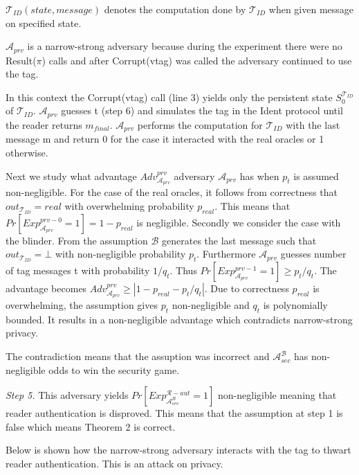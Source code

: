     $\mathcal{T}_{ID}(state, message)$ denotes the computation done by $\mathcal{T}_{ID}$ 
    when given message on specified state. 
    
    $\mathcal{A}_{prv}$ is a narrow-strong adversary because during the experiment there were no Result($\pi$) calls and after Corrupt(vtag) was called 
    the adversary continued to use the tag.

    In this context the Corrupt(vtag) call (line 3) yields only the persistent state $S_0^{\mathcal{T}_{ID}}$ of 
    $\mathcal{T}_{ID}$. $\mathcal{A}_{prv}$ guesses t (step 6) and simulates the tag in the Ident protocol until 
    the reader returns $m_{final}$. $\mathcal{A}_{prv}$ performs the computation for $\mathcal{T}_{ID}$ with the last
    message m and return 0 for the case it interacted with the real oracles or 1 otherwise.

    Next we study what advantage $Adv_{\mathcal{A}_{prv}}^{prv}$ adversary $\mathcal{A}_{prv}$ has when $p_t$ is assumed non-negligible.
    For the case of the real oracles, it follows from correctness that $out_{\mathcal{T}_{ID}} = real$ with overwhelming
    probability $p_{real}$. This means that $Pr[Exp_{\mathcal{A}_{prv}}^{prv-0} = 1] = 1-p_{real}$ is negligible. Secondly we consider the case
    with the blinder. From the assumption $\mathcal{B}$ generates the last message such that $out_{\mathcal{T}_{ID}} = \bot$ with 
    non-negligible probability $p_t$. Furthermore $\mathcal{A}_{prv}$ guesses number of tag messages t with 
    probability $1/q_t$. Thus $Pr[Exp_{\mathcal{A}_{prv}}^{prv-1} = 1] \ge p_t/q_t$. The advantage becomes
    $Adv_{\mathcal{A}_{prv}}^{prv} \ge |1-p_{real}-p_t/q_t|$. Due to correctness $p_{real}$ is overwhelming, the 
    assumption gives $p_t$ non-negligible and $q_t$ is polynomially bounded. It results in a non-negligible 
    advantage which contradicts narrow-strong privacy.

    The contradiction means that the assuption was incorrect and $\mathcal{A}_{sec}^{\mathcal{B}}$ has non-negligible odds to win the security game.

    \textit{Step 5.} This adversary yields $Pr[Exp_{\mathcal{A}_{sec}^{B}}^{\mathcal{R}-aut} = 1]$ non-negligible meaning that reader authentication is disproved. 
    This means that the assumption at step 1 is false which means Theorem 2 is correct. 

    Below is shown how the narrow-strong adversary interacts with the tag to
    thwart reader authentication. This is an attack on privacy.

